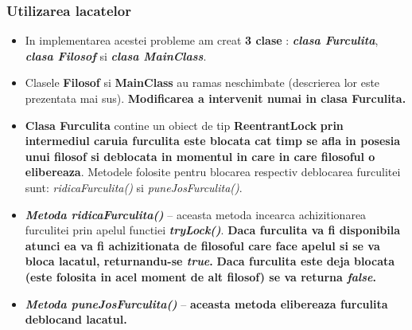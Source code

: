 \documentclass[14pt]{article}
\begin{document}
\subsubsection{\textbf{Utilizarea lacatelor}}

\vspace{2 mm}

\begin{itemize}
\item In implementarea acestei probleme am creat \textbf{3 clase} :\textbf{\textit{ clasa Furculita}}, \textbf{\textit{clasa Filosof}} si \textbf{\textit{clasa MainClass}}.
\end{itemize}


\begin{itemize}
\item Clasele \textbf{Filosof} si \textbf{MainClass} au ramas neschimbate (descrierea lor este prezentata mai sus).\textbf{ Modificarea a intervenit numai in clasa Furculita.}
\end{itemize}


\begin{itemize}
\item \textbf{Clasa Furculita} contine un obiect de tip \textbf{ReentrantLock}\textbf{ prin intermediul caruia furculita este blocata cat timp se afla in posesia unui filosof si deblocata in momentul in care in care filosoful o elibereaza}. Metodele folosite pentru blocarea respectiv deblocarea furculitei sunt:\textit{ ridicaFurculita()} si \textit{puneJosFurculita()}.
\end{itemize}


\begin{itemize}
\item \textbf{\textit{Metoda ridicaFurculita() }}-- aceasta metoda incearca achizitionarea furculitei prin apelul functiei\textbf{\textit{ tryLock()}}. \textbf{Daca furculita va fi disponibila atunci ea va fi achizitionata de filosoful care face apelul si se va bloca lacatul, returnandu-se \textit{true}.}\textbf{ Daca furculita este deja blocata (este folosita in acel moment de alt filosof) se va returna \textit{false}.}
\end{itemize}


\begin{itemize}
\item \textbf{\textit{Metoda puneJosFurculita()}} --\textbf{ aceasta metoda elibereaza furculita deblocand lacatul.}
\end{itemize}

\newpage
\end{document}

